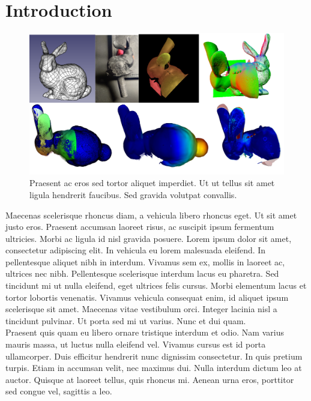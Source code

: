 \documentclass[paper=a4,dissertation,math,vertlayout,pdfa,colorlinks,nologo]{aaltoseries}
\newcommand\tab[1][1cm]{\hspace*{#1}}
\begin{document}
\chapter{Introduction}
\vspace{-25ex}
\begin{figure}[h!]
    \centering
    \includegraphics[width=130mm]{images/evolution.png}
    \caption{Praesent ac eros sed tortor aliquet imperdiet. Ut ut tellus sit amet ligula hendrerit faucibus. Sed gravida volutpat convallis.}
\end{figure}
\tab Maecenas scelerisque rhoncus diam, a vehicula libero rhoncus eget. Ut sit amet justo eros. Praesent accumsan laoreet risus, ac suscipit ipsum fermentum ultricies. Morbi ac ligula id nisl gravida posuere. Lorem ipsum dolor sit amet, consectetur adipiscing elit. In vehicula eu lorem malesuada eleifend. In pellentesque aliquet nibh in interdum. Vivamus sem ex, mollis in laoreet ac, ultrices nec nibh. Pellentesque scelerisque interdum lacus eu pharetra. Sed tincidunt mi ut nulla eleifend, eget ultrices felis cursus. Morbi elementum lacus et tortor lobortis venenatis. Vivamus vehicula consequat enim, id aliquet ipsum scelerisque sit amet. Maecenas vitae vestibulum orci. Integer lacinia nisl a tincidunt pulvinar. Ut porta sed mi ut varius. Nunc et dui quam.
\\ \tab Praesent quis quam eu libero ornare tristique interdum et odio. Nam varius mauris massa, ut luctus nulla eleifend vel. Vivamus cursus est id porta ullamcorper. Duis efficitur hendrerit nunc dignissim consectetur. In quis pretium turpis. Etiam in accumsan velit, nec maximus dui. Nulla interdum dictum leo at auctor. Quisque at laoreet tellus, quis rhoncus mi. Aenean urna eros, porttitor sed congue vel, sagittis a leo.
\end{document}
